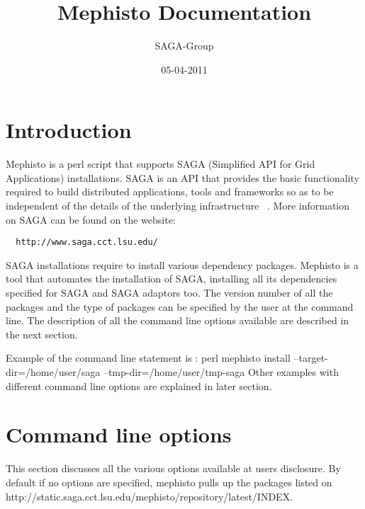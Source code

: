 \documentclass[a4paper,10pt]{article}
\newcommand{\jhanote}[1]{  {\textcolor{red}     { ***Shantenu: #1 }}}
\newcommand{\jhanote}[1]{}
\begin{document}
 \title{ \Large \vspace{-3.5em} Mephisto Documentation }
 
 \author{ SAGA-Group}
 \date{05-04-2011}
 \maketitle
 




\section*{Introduction}
Mephisto is a perl script that supports SAGA (Simplified API for Grid Applications) installations. SAGA is an API that provides the basic functionality required to build distributed applications, tools and frameworks so as to be independent of the details of the underlying infrastructure ~\cite{}. More information on SAGA can be found on the website:
\begin{verbatim}
  http://www.saga.cct.lsu.edu/
\end{verbatim}

SAGA installations require to install various dependency packages. Mephisto is a tool that automates the installation of SAGA, installing all its dependencies specified for SAGA and SAGA adaptors too.  The version number of all the packages and the type of packages can be specified by the user at the command line. The description of all the command line options available are described in the next section.

Example of the command line statement is : perl mephisto install --target-dir=/home/user/saga --tmp-dir=/home/user/tmp-saga
Other examples with different command line options are explained in later section. 

\section*{Command line options}
This section discusses all the various options available at users disclosure. By default if no options are specified, mephisto pulls up the packages listed on http://static.saga.cct.lsu.edu/mephisto/repository/latest/INDEX. 
\end{document}
